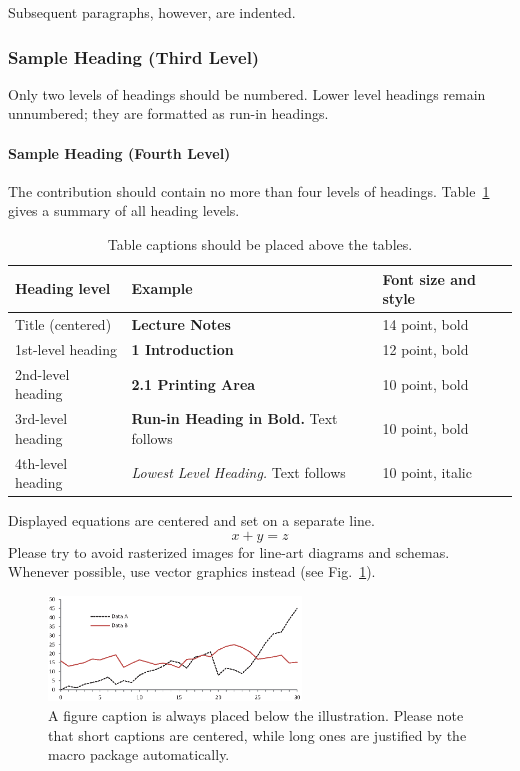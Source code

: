 \documentclass{llncs}
\begin{document}
Subsequent paragraphs, however, are indented.

\subsubsection{Sample Heading (Third Level)} Only two levels of
headings should be numbered. Lower level headings remain unnumbered;
they are formatted as run-in headings.

\paragraph{Sample Heading (Fourth Level)}
The contribution should contain no more than four levels of
headings. Table~\ref{tab1} gives a summary of all heading levels.

\begin{table}
\caption{Table captions should be placed above the
tables.}\label{tab1}
\centering
\begin{tabular}{|l|l|l|}
\hline
Heading level &  Example & Font size and style\\
\hline
Title (centered) &  {\Large\bfseries Lecture Notes} & 14 point, bold\\
1st-level heading &  {\large\bfseries 1 Introduction} & 12 point, bold\\
2nd-level heading & {\bfseries 2.1 Printing Area} & 10 point, bold\\
3rd-level heading & {\bfseries Run-in Heading in Bold.} Text follows & 10 point, bold\\
4th-level heading & {\itshape Lowest Level Heading.} Text follows & 10 point, italic\\
\hline
\end{tabular}
\end{table}

\noindent Displayed equations are centered and set on a separate
line.
\begin{equation}
x + y = z
\end{equation}
Please try to avoid rasterized images for line-art diagrams and
schemas. Whenever possible, use vector graphics instead (see
Fig.~\ref{fig1}).

\begin{figure}
\includegraphics[width=0.6\textwidth]{fig1.eps}
\centering
\caption{A figure caption is always placed below the illustration.
Please note that short captions are centered, while long ones are
justified by the macro package automatically.} \label{fig1}
\end{figure}
\end{document}
